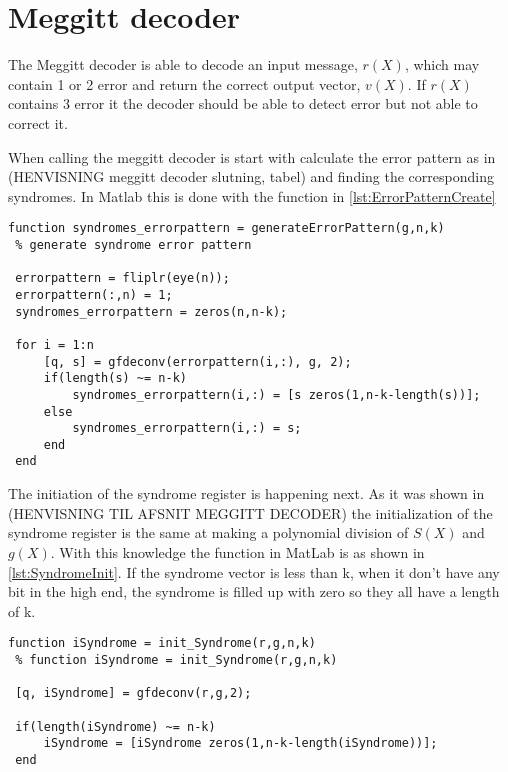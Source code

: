 \documentclass[Main]{subfiles}
\begin{document}
\section{Meggitt decoder}
The Meggitt decoder is able to decode an input message, $r(X)$, which may contain 1 or 2 error and return the correct output vector, $v(X)$.
If $r(X)$ contains 3 error it the decoder should be able to detect error but not able to correct it.

When calling the meggitt decoder is start with calculate the error pattern as in (HENVISNING meggitt decoder slutning, tabel) and finding the corresponding syndromes.
In Matlab this is done with the function in \codeTitle \ref{lst:ErrorPatternCreate}

\begin{lstlisting}[caption=Error pattern creation, style=Code-Matlab, label=lst:ErrorPatternCreate]
 function syndromes_errorpattern = generateErrorPattern(g,n,k)
 % generate syndrome error pattern
 
 errorpattern = fliplr(eye(n));
 errorpattern(:,n) = 1;
 syndromes_errorpattern = zeros(n,n-k);
 
 for i = 1:n
     [q, s] = gfdeconv(errorpattern(i,:), g, 2);
     if(length(s) ~= n-k)
         syndromes_errorpattern(i,:) = [s zeros(1,n-k-length(s))];
     else
         syndromes_errorpattern(i,:) = s;
     end
 end
\end{lstlisting}

The initiation of the syndrome register is happening next.
As it was shown in (HENVISNING TIL AFSNIT MEGGITT DECODER) the initialization of the syndrome register is the same at making a polynomial division of $S(X)$ and $g(X)$.
With this knowledge the function in MatLab is as shown in \codeTitle \ref{lst:SyndromeInit}.
If the syndrome vector is less than k, when it don't have any bit in the high end, the syndrome is filled up with zero so they all have a length of k.

\begin{lstlisting}[caption=Syndrome initialization, style=Code-Matlab, label=lst:SyndromeInit]
 function iSyndrome = init_Syndrome(r,g,n,k)
 % function iSyndrome = init_Syndrome(r,g,n,k)
 
 [q, iSyndrome] = gfdeconv(r,g,2);
 
 if(length(iSyndrome) ~= n-k)
     iSyndrome = [iSyndrome zeros(1,n-k-length(iSyndrome))];
 end
\end{lstlisting}
\end{document}

